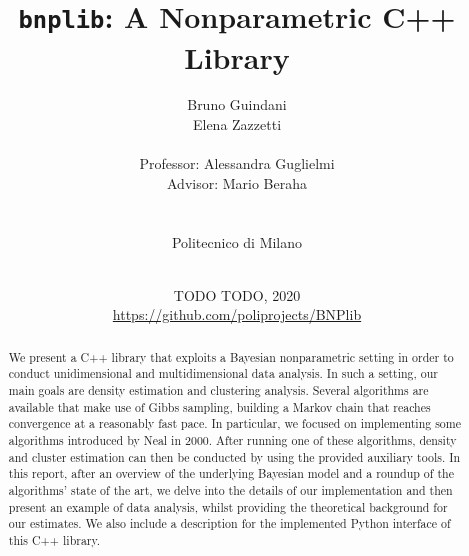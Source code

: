 \documentclass[a4paper]{report}
\title{\texttt{bnplib}: A Nonparametric C++ Library}
\author{
Bruno Guindani \\
Elena Zazzetti \\
\\
Professor: Alessandra Guglielmi \\
Advisor: Mario Beraha \\
\\
\\
Politecnico di Milano \\
\\
}
\date{
TODO TODO, 2020
\\[250pt]
{\color{gray} {\url{https://github.com/poliprojects/BNPlib}}}}
\begin{document}
\maketitle

\begin{abstract}
We present a C++ library that exploits a Bayesian nonparametric setting in order to conduct unidimensional and multidimensional data analysis.
In such a setting, our main goals are density estimation and clustering analysis.
Several algorithms are available that make use of Gibbs sampling, building a Markov chain that reaches convergence at a reasonably fast pace.
In particular, we focused on implementing some algorithms introduced by Neal in 2000.
After running one of these algorithms, density and cluster estimation can then be conducted by using the provided auxiliary tools.
In this report, after an overview of the underlying Bayesian model and a roundup of the algorithms' state of the art, we delve into the details of our implementation and then present an example of data analysis, whilst providing the theoretical background for our estimates.
We also include a description for the implemented Python interface of this C++ library.
\end{abstract}
\clearpage

\tableofcontents










\end{document}
